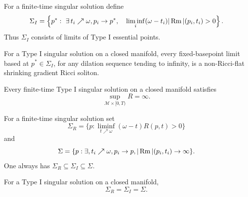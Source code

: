\begin{definition}
\label{def:chow-iv-type-i-singular-point-set}

For a finite-time singular solution define
\[
 \Sigma_I=\left\{p^*:\ \exists\,t_i\nearrow\omega, p_i\to p^*,
 \quad\liminf_i(\omega-t_i)|\operatorname{Rm}|(p_i,t_i)>0\right\}.
\]
Thus \(\Sigma_I\) consists of limits of Type I essential points.
\end{definition}

\begin{theorem}
\label{thm:chow-iv-type-i-singular-point-limits-nonflat}


For a Type I singular solution on a closed manifold, every fixed-basepoint
limit based at \(p^*\in\Sigma_I\), for any dilation sequence tending to
infinity, is a non-Ricci-flat shrinking gradient Ricci soliton.
\end{theorem}

\begin{theorem}
\label{thm:chow-iv-type-i-singular-scalar-curvature-unbounded}


Every finite-time Type I singular solution on a closed manifold satisfies
\[
 \sup_{\mathcal M\times[0,T)}R=\infty.
\]
\end{theorem}

\begin{definition}
\label{def:chow-iv-singular-point-sets}

For a finite-time singular solution set
\[
 \Sigma_R=\{p:\liminf_{t\nearrow\omega}(\omega-t)R(p,t)>0\}
\]
and
\[
 \Sigma=\{p:\exists,t_i\nearrow\omega, p_i\to p,
 |\operatorname{Rm}|(p_i,t_i)\to\infty\}.
\]
One always has \(\Sigma_R\subseteq\Sigma_I\subseteq\Sigma\).
\end{definition}

\begin{theorem}
\label{thm:chow-iv-type-i-singular-point-sets-equal}


For a Type I singular solution on a closed manifold,
\[
 \Sigma_R=\Sigma_I=\Sigma.
\]
\end{theorem}


